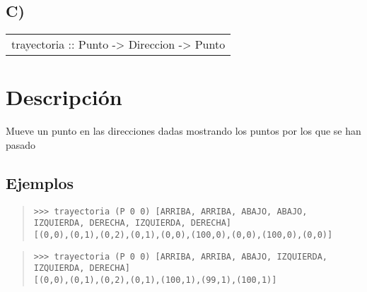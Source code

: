 \subsection{C)}
\begin{haddockdesc}
\item[\begin{tabular}{@{}l}
trayectoria :: Punto -> {\char 91}Direccion{\char 93} -> {\char 91}Punto{\char 93}
\end{tabular}]
{\haddockbegindoc
\section*{Descripción}
Mueve un punto en las direcciones dadas mostrando los puntos por los que se han pasado\par
\subsection*{Ejemplos}
\begin{quote}
{\haddockverb\begin{verbatim}
>>> trayectoria (P 0 0) [ARRIBA, ARRIBA, ABAJO, ABAJO, IZQUIERDA, DERECHA, IZQUIERDA, DERECHA]
[(0,0),(0,1),(0,2),(0,1),(0,0),(100,0),(0,0),(100,0),(0,0)]

\end{verbatim}}
\end{quote}
\begin{quote}
{\haddockverb\begin{verbatim}
>>> trayectoria (P 0 0) [ARRIBA, ARRIBA, ABAJO, IZQUIERDA, IZQUIERDA, DERECHA]
[(0,0),(0,1),(0,2),(0,1),(100,1),(99,1),(100,1)]

\end{verbatim}}
\end{quote}}
\end{haddockdesc}

